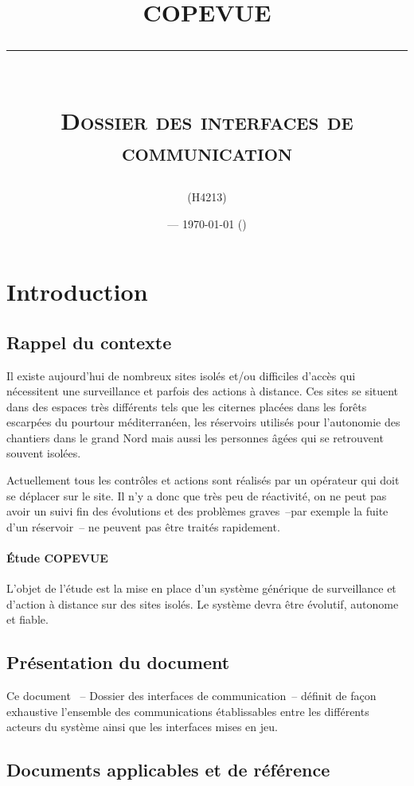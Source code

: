 \documentclass[a4paper, 11pt, final]{article}
\title{\textbf{COPEVUE}\\
\rule{\textwidth}{1pt}{}\\
\Huge{\textsc{Dossier des interfaces de communication}}}
\author{\docauthor{} (H4213)}
\date{\docname{} --- \today{} (\docstatus{})}
\begin{document}
\maketitle

\tableofcontents

\pagebreak

\section{Introduction}

\subsection{Rappel du contexte}
Il existe aujourd'hui de nombreux sites isolés et/ou difficiles d'accès
qui nécessitent une surveillance et parfois des actions à distance.
Ces sites se situent dans des espaces très différents tels que les
citernes placées dans les forêts escarpées du pourtour méditerranéen,
les réservoirs utilisés pour l'autonomie des chantiers dans le grand
Nord mais aussi les personnes âgées qui se retrouvent souvent isolées.

Actuellement tous les contrôles et actions sont réalisés par un opérateur
qui doit se déplacer sur le site.
Il n'y a donc que très peu de réactivité, on ne peut pas avoir un suivi
fin des évolutions et des problèmes graves~--par exemple la fuite d'un
réservoir~-- ne peuvent pas être traités rapidement.

\paragraph{Étude COPEVUE}
L'objet de l'étude est la mise en place d'un système générique de
surveillance et d'action à distance sur des sites isolés.
Le système devra être évolutif, autonome et fiable.

\subsection{Présentation du document}
Ce document ~-- Dossier des interfaces de communication~-- définit de
façon exhaustive l'ensemble des communications établissables entre les
différents acteurs du système ainsi que les interfaces mises en jeu.

\subsection{Documents applicables et de référence}
\end{document}
